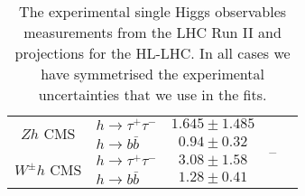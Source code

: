 \begin{table}[ht!]
{{\begin{tabular}{clccc}
\midrule
\midrule
\multirow{2}{*}{ \normalsize $Zh$ { \scriptsize {\color{Mahogany} CMS     }   }}    & $h\to \tau^+\tau^- $ & $1.645 \pm 1.485$&\multirow{5}{*}{--} &\multirow{5}{*}{ \cite{CMS:2020gsy} }  \\
& $h\to  b \bar b$       &$0.94 \pm 0.32$&&\\                         
 \cmidrule(r){2-3}    
\multirow{2}{*}{ \normalsize $W^\pm h${ \scriptsize {\color{Mahogany} CMS     }   }}           & $h\to \tau^+\tau^- $ &$3.08 \pm 1.58$&&\\
& $h\to  b \bar b$      & $1.28 \pm 0.41$&&\\                  
\midrule
\midrule
\end{tabular}
}
}
\caption{The experimental single Higgs observables measurements from the LHC Run II and projections for the HL-LHC.
In all cases we have symmetrised the experimental uncertainties that we use in the fits.  }
\label{table:resHiggsExp}
\end{table}